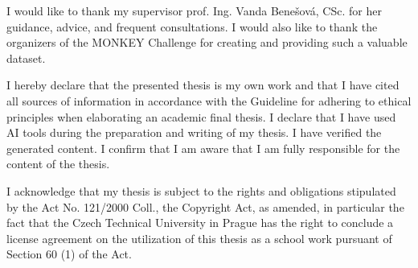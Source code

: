 \documentclass[english,master,oneside]{ctufit-thesis}
\begin{document}
\frontmatter\frontmatterinit %

\thispagestyle{empty}\maketitle\thispagestyle{empty}\cleardoublepage %


\imprintpage %
\stopTOCentries

\begin{acknowledgmentpage}
	I would like to thank my supervisor prof. Ing. Vanda Benešová, CSc. for her guidance, advice, and frequent consultations. I would also like to thank the organizers of the MONKEY Challenge for creating and providing such a valuable dataset.
\end{acknowledgmentpage}


\begin{declarationpage}
	I hereby declare that the presented thesis is my own work and that I have cited all sources of information in accordance with the Guideline for adhering to ethical principles when elaborating an academic final thesis. I declare that I have used AI tools during the preparation and writing of my thesis. I have verified the generated content. I confirm that I am aware that I am fully responsible for the content of the thesis.
    
    I acknowledge that my thesis is subject to the rights and obligations stipulated by the Act No. 121/2000 Coll., the Copyright Act, as amended, in particular the fact that the Czech Technical University in Prague has the right to conclude a license agreement on the utilization of this thesis as a school work pursuant of Section 60 (1) of the Act.
\end{declarationpage}
\end{document}
